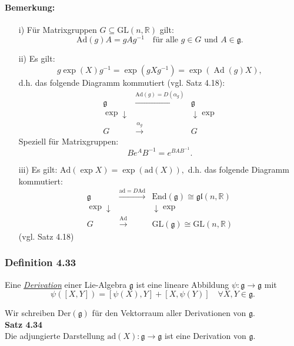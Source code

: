\documentclass[fleqn, 12pt, letterpaper]{article}
\begin{document}
\paragraph{Bemerkung:}
\begin{itemize}
    \item[i)] Für Matrixgruppen $G \subseteq \mathrm{GL}(n, \mathbb{R})$ gilt:
    \[
    \mathrm{Ad}(g) A = g A g^{-1} \quad \text{für alle } g \in G \text{ und } A \in \mathfrak{g}.
    \]

    \item[ii)] Es gilt:
    \[
    g \exp(X) g^{-1} = \exp(g X g^{-1}) = \exp(\operatorname{Ad}(g)X),
    \]
    d.h. das folgende Diagramm kommutiert (vgl. Satz 4.18):
    \[
    \begin{array}{ccc}
        \mathfrak{g} & \xrightarrow{\mathrm{Ad}(g) = D(\alpha_g)} & \mathfrak{g} \\
        \exp \downarrow &  & \downarrow \exp \\
        G & \xrightarrow{\alpha_g} & G
    \end{array}
    \]
    Speziell für Matrixgruppen:
\[
B e^A B^{-1} = e^{BAB^{-1}}.
\]
  \item[iii)] Es gilt:
\(
\mathrm{Ad}(\exp X) = \exp(\mathrm{ad}(X)),
\)
d.h. das folgende Diagramm kommutiert:
\[
\begin{array}{ccc}
\mathfrak{g} & \xrightarrow{\mathrm{ad} = D\mathrm{Ad}} & \mathrm{End}(\mathfrak{g}) \cong \mathfrak{gl}(n, \mathbb{R}) \\
\exp \downarrow &  & \downarrow \exp \\
G & \xrightarrow{\mathrm{Ad}} & \mathrm{GL}(\mathfrak{g}) \cong \mathrm{GL}(n, \mathbb{R})
\end{array}
\]
\hfill (vgl. Satz 4.18)
\end{itemize}

\subsubsection*{Definition 4.33}
Eine \emph{\underline{Derivation}} einer Lie-Algebra $\mathfrak{g}$ ist eine lineare Abbildung
\(
\psi \colon \mathfrak{g} \to \mathfrak{g}
\)
mit
\[
\psi([X, Y]) = [\psi(X), Y] + [X, \psi(Y)] \quad \forall X, Y \in \mathfrak{g}.
\]

Wir schreiben $\mathrm{Der}(\mathfrak{g})$ für den Vektorraum aller Derivationen von $\mathfrak{g}$.\\

\textbf{Satz 4.34}\\
Die adjungierte Darstellung $\mathrm{ad}(X) \colon \mathfrak{g} \to \mathfrak{g}$ ist eine Derivation von $\mathfrak{g}$.
\end{document}
